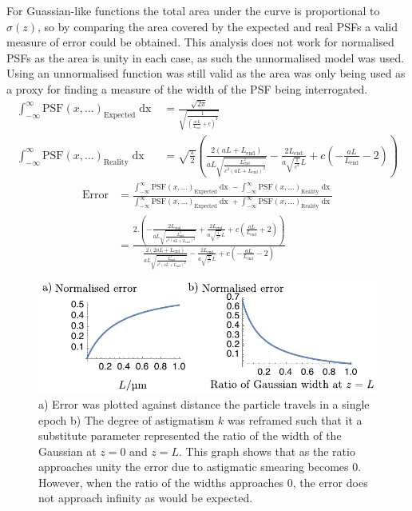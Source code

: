 For Guassian-like functions the total area under the curve is proportional to $\sigma(z)$, so by comparing the area covered by the expected and real PSFs a valid measure of error could be obtained.
This analysis does not work for normalised PSFs as the area is unity in each case, as such the unnormalised model was used.
Using an unnormalised function was still valid as the area was only being used as a proxy for finding a measure of the width of the PSF being interrogated.
\begin{align*}
  \int_{-\infty}^{\infty} \text{PSF}(x,...)_{\text{Expected}} \mathop{dx} &= \frac{\sqrt{2 \pi }}{\sqrt{\frac{1}{\left(\frac{a c L}{L_{\text{end}}}+c\right)^2}}}\\
  \int_{-\infty}^{\infty} \text{PSF}(x,...)_{\text{Reality}} \mathop{dx} &=\sqrt{\frac{\pi }{2}} \left(\frac{2 (a L+L_{\text{end}})}{a L \sqrt{\frac{L_{\text{end}}^2}{c^2 (a L+L_{\text{end}})^2}}}-\frac{2 L_{\text{end}}}{a \sqrt{\frac{1}{c^2}} L}+c \left(-\frac{a L}{L_{\text{end}}}-2\right)\right)
\end{align*}
\begin{align*}
  \text{Error} &= \frac{\int_{-\infty}^{\infty} \text{PSF}(x,...)_{\text{Expected}} \mathop{dx} - \int_{-\infty}^{\infty} \text{PSF}(x,...)_{\text{Reality}}\mathop{dx}}
  {\int_{-\infty}^{\infty} \text{PSF}(x,...)_{\text{Expected}} \mathop{dx} + \int_{-\infty}^{\infty} \text{PSF}(x,...)_{\text{Reality}}\mathop{dx}} \\
  &= \frac{2. \left(-\frac{2 L_{\text{end}}}{a L \sqrt{\frac{L_{\text{end}}^2}{c^2 (a L+L_{\text{end}})^2}}}+\frac{2 L_{\text{end}}}{a \sqrt{\frac{1}{c^2}} L}+c \left(\frac{a L}{L_{\text{end}}}+2\right)\right)}{\frac{2 (2 a L+L_{\text{end}})}{a L \sqrt{\frac{L_{\text{end}}^2}{c^2 (a L+L_{\text{end}})^2}}}-\frac{2 L_{\text{end}}}{a \sqrt{\frac{1}{c^2}} L}+c \left(-\frac{a L}{L_{\text{end}}}-2\right)}
\end{align*}

\begin{figure}
  \centering
  \includegraphics{./mathematica/area_analysis}
  \caption{
  a) Error was plotted against distance the particle travels in a single epoch%
  b) The degree of astigmatism $k$ was reframed such that it a substitute parameter represented the ratio of the width of the Gaussian at $z=0$ and $z=L$.
  This graph shows that as the ratio approaches unity the error due to astigmatic smearing becomes $0$.
  However, when the ratio of the widths approaches 0, the error does not approach infinity as would be expected.
  }
  \label{fig:area_analysis}
\end{figure}

